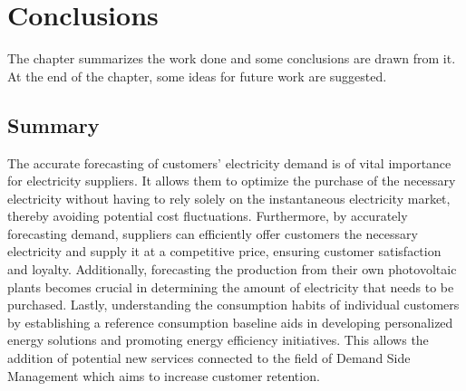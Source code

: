 \chapter{Conclusions}
\label{cha:conclusions}
\vspace{0.4 cm}

The chapter summarizes the work done and some conclusions are drawn from it.
At the end of the chapter, some ideas for future work are suggested.


\section{Summary}
\label{sec:summary}
\vspace{0.2 cm}

The accurate forecasting of customers’ electricity demand is of vital importance for electricity suppliers.
It allows them to optimize the purchase of the necessary electricity without having to rely solely on the instantaneous electricity market, thereby avoiding potential cost fluctuations.
Furthermore, by accurately forecasting demand, suppliers can efficiently offer customers the necessary electricity and supply it at a competitive price, ensuring customer satisfaction and loyalty.
Additionally, forecasting the production from their own photovoltaic plants becomes crucial in determining the amount of electricity that needs to be purchased.
Lastly, understanding the consumption habits of individual customers by establishing a reference consumption baseline aids in developing personalized energy solutions and promoting energy efficiency initiatives.
This allows the addition of potential new services connected to the field of Demand Side Management which aims to increase customer retention.

